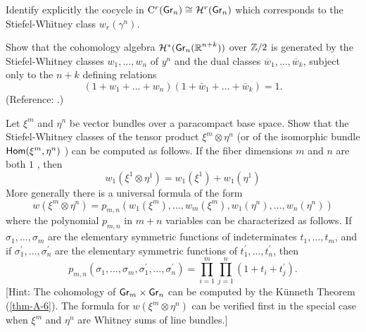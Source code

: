 \begin{problem}\label{prob-7-A}
	Identify explicitly the cocycle in $\mathrm{C}^{r}(\grass{n}{}) \cong \homology^{r}(\grass{n}{})$ which corresponds to the Stiefel-Whitney class $w_{r}(\gamma^{n})$.
\end{problem}
\begin{problem}\label{prob-7-B}
	Show that the cohomology algebra $\homology^{*}(\grass{n}{n+k})$ over $\mathbb{Z} / 2$ is generated by the Stiefel-Whitney classes $w_{1}, \dots, w_{n}$ of $y^{n}$ and the dual classes $\overline{w}_{1}, \dots, \overline{w}_{k}$, subject only to the $n+k$ defining relations
	\[
	(1+w_{1}+\dots+w_{n})(1+\bar{w}_{1}+\dots+\bar{w}_{k})=1.
	\]
	(Reference: \cite[p.~190]{79}.)
\end{problem}
\begin{problem}\label{prob-7-C}
	Let $\xi^{m}$ and $\eta^{n}$ be vector bundles over a paracompact base space. Show that the Stiefel-Whitney classes of the tensor product $\xi^{m} \otimes \eta^{n}$ (or of the isomorphic bundle $\mathsf{Hom}(\xi^{m}, \eta^{n})$ ) can be computed as follows. If the fiber dimensions $m$ and $n$ are both $ 1 $ , then
	\[
	w_{1}(\xi^{1} \otimes \eta^{1})=w_{1}(\xi^{1})+w_{1}(\eta^{1})
	\]
	More generally there is a universal formula of the form
	\[
	w(\xi^{m} \otimes \eta^{n})=p_{m, n}\left(w_{1}(\xi^{m}), \dots, w_{m}(\xi^{m}), w_{1}(\eta^{n}), \dots, w_{n}(\eta^{n})\right)
	\]
	where the polynomial $p_{m, n}$ in $m+n$ variables can be characterized as follows. If $\sigma_{1}, \dots, \sigma_{m}$ are the elementary symmetric functions of indeterminates $t_{1}, \dots, t_{m}$, and if $\sigma_{1}^{\prime}, \dots, \sigma_{n}^{\prime}$ are the elementary symmetric functions of $t_{1}^{\prime}, \dots, t_{n}^{\prime}$, then
	\[
	p_{m, n}(\sigma_{1}, \dots, \sigma_{m}, \sigma_{1}^{\prime}, \dots, \sigma_{n}^{\prime})=\prod_{i=1}^{m} \prod_{j=1}^{n}(1+t_{i}+t_{j}^{\prime}).
	\]
	[Hint: The cohomology of $\grass{m}{} \times \grass{n}{}$ can be computed by the Künneth Theorem (\cref{thm-A-6}). The formula for $w(\xi^{m} \otimes \eta^{n})$ can be verified first in the special case when $\xi^{m}$ and $\eta^{n}$ are Whitney sums of line bundles.]
\end{problem}

